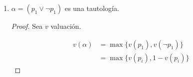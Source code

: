 \begin{enumerate}
\begin{proof}
\begin{enumerate}
            \begin{align*}
                v_f(\alpha) &= \min \{ v_f(p_1), v_f(p_2) \}
                \notamath{Esto nos asegura que $\alpha$ \textit{no} es una 
                contradicción.} \\
                &= \min \{ \underbrace{f(p_1)}_{=1}, 
                \underbrace{f(p_2)}_{=1} \} \\
                &= 1 \\
            \end{align*}
            \begin{gather*}
                \therefore ~ v_f(\alpha)=1
            \end{gather*}

            \item Defino $g: \mathrm{VAR} \to \{ 0,1 \}/ g(p_j) = 0$, $\forall j$.

            Sea $v_g$ la única valuación que extiende a $g$.

            \begin{align*}
                v_g(\alpha) &= \min \{ v_g(p_1), v_g(p_2) \} 
                \notamath{Análogamente, esto nos asegura que $\alpha$ 
                    \textit{no} es una tautología.}\\
                &= \min \{ \underbrace{g(p_1)}_{=0},
                \underbrace{g(p_2)}_{=0} \} \\
                &= 0 \\
            \end{align*}
            \begin{gather*}
                \therefore ~ v_g(\alpha)=0
            \end{gather*}
            \end{enumerate}

            Por lo tanto, por 1 y 2, $\alpha$ es una contingencia.
        \end{proof}
    \item $\alpha = (p_1 \vee \neg p_1)$ es una tautología.

        \begin{proof} \phantom{.}
        
            Sea $v$ valuación.

            \begin{align*}
                v(\alpha) &= \max{\{ v(p_1), v(\neg p_1) \}} \\
                          &= \max{\{ v(p_i), 1-v(p_i) \}}
            \end{align*}


\end{proof}
\end{enumerate}
